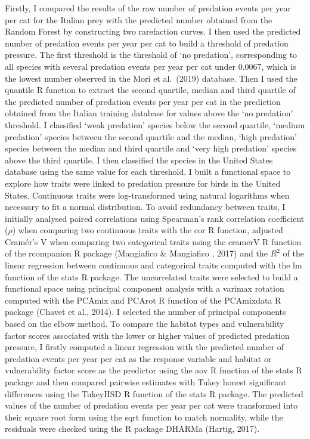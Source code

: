 \documentclass[
  super,
  review,
  3p]{elsarticle}
\begin{document}
Firstly, I compared the results of the raw number of predation events
per year per cat for the Italian prey with the predicted number obtained
from the Random Forest by constructing two rarefaction curves. I then
used the predicted number of predation events per year per cat to build
a threshold of predation pressure. The first threshold is the threshold
of `no predation', corresponding to all species with several predation
events per year per cat under 0.0067, which is the lowest number
observed in the Mori et al.~(2019) database. Then I used the quantile R
function to extract the second quartile, median and third quartile of
the predicted number of predation events per year per cat in the
prediction obtained from the Italian training database for values above
the `no predation' threshold. I classified `weak predation' species
below the second quartile, `medium predation' species between the second
quartile and the median, `high predation' species between the median and
third quartile and `very high predation' species above the third
quartile. I then classified the species in the United States database
using the same value for each threshold. I built a functional space to
explore how traits were linked to predation pressure for birds in the
United States. Continuous traits were log-transformed using natural
logarithms when necessary to fit a normal distribution. To avoid
redundancy between traits, I initially analysed paired correlations
using Spearman's rank correlation coefficient (\(\rho\)) when comparing
two continuous traits with the cor R function, adjusted Cramér's V when
comparing two categorical traits using the cramerV R function of the
rcompanion R package (Mangiafico \& Mangiafico , 2017) and the \(R^{2}\)
of the linear regression between continuous and categorical traits
computed with the lm function of the stats R package. The uncorrelated
traits were selected to build a functional space using principal
component analysis with a varimax rotation computed with the PCAmix and
PCArot R function of the PCAmixdata R package (Chavet et al., 2014). I
selected the number of principal components based on the elbow method.
To compare the habitat types and vulnerability factor scores associated
with the lower or higher values of predicted predation pressure, I
firstly computed a linear regression with the predicted number of
predation events per year per cat as the response variable and habitat
or vulnerability factor score as the predictor using the aov R function
of the stats R package and then compared pairwise estimates with Tukey
honest significant differences using the TukeyHSD R function of the
stats R package. The predicted values of the number of predation events
per year per cat were transformed into their square root form using the
sqrt function to match normality, while the residuals were checked using
the R package DHARMa (Hartig, 2017).
\end{document}
